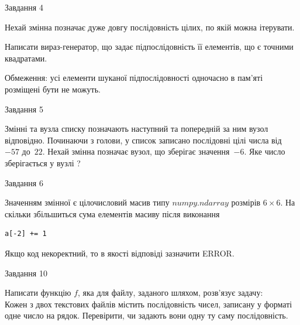 \documentclass[12pt, ukrainian]{article}
\begin{document}
{\begin{minipage}[t]{8.0cm}
\end{minipage}


               
{\begin{center}Завдання {4}\end{center}}
\vspace{-4mm}
Нехай змінна  позначає дуже довгу послідовність цілих, по якій можна ітерувати.

Написати вираз-генератор, що задає підпослідовність її елементів, що є точними квадратами.

Обмеження: усі елементи шуканої підпослідовності одночасно в пам'яті розміщені бути не можуть.\par

\vspace{10mm}
               
{\begin{center}Завдання {5}\end{center}}
\vspace{-4mm}
Змінні  та  вузла списку позначають наступний та попередній за ним вузол відповідно. Починаючи з голови, у список записано послідовні цілі числа від~$-57$ до~$22$. Нехай змінна  позначає вузол, що зберігає значення~$-6$.
Яке число зберігається у вузлі  ?\par

               
{\begin{center}Завдання {6}\end{center}}
\vspace{-4mm}
Значенням змінної  є цілочисловий масив типу $numpy.ndarray$ розмірів $6{\times}6$. На скільки збільшиться сума елементів масиву  після виконання
\begin{verbatim}
a[-2] += 1
\end{verbatim}


Якщо код некоректний, то в якості відповіді зазначити ERROR.\par

               
{\begin{center}Завдання {10}\end{center}}
\vspace{-4mm}

Написати функцію $f$, яка для файлу, заданого шляхом, розв’язує задачу:\\ Кожен з двох текстових файлів містить послідовність чисел, записану у форматі одне число на рядок.  Перевірити, чи задають вони одну ту саму послідовність.

}
\end{document}
